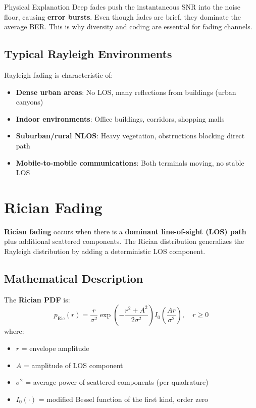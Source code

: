 \begin{calloutbox}{Physical Explanation}
Deep fades push the instantaneous SNR into the noise floor, causing \textbf{error bursts}. Even though fades are brief, they dominate the average BER. This is why diversity and coding are essential for fading channels.
\end{calloutbox}

\subsection{Typical Rayleigh Environments}

Rayleigh fading is characteristic of:
\begin{itemize}
\item \textbf{Dense urban areas}: No LOS, many reflections from buildings (urban canyons)
\item \textbf{Indoor environments}: Office buildings, corridors, shopping malls
\item \textbf{Suburban/rural NLOS}: Heavy vegetation, obstructions blocking direct path
\item \textbf{Mobile-to-mobile communications}: Both terminals moving, no stable LOS
\end{itemize}

\section{Rician Fading}

\textbf{Rician fading} occurs when there is a \textbf{dominant line-of-sight (LOS) path} plus additional scattered components. The Rician distribution generalizes the Rayleigh distribution by adding a deterministic LOS component.

\subsection{Mathematical Description}

The \textbf{Rician PDF} is:
\begin{equation}
p_{\text{Ric}}(r) = \frac{r}{\sigma^2} \exp\left(-\frac{r^2 + A^2}{2\sigma^2}\right) I_0\left(\frac{Ar}{\sigma^2}\right), \quad r \geq 0
\end{equation}
where:
\begin{itemize}
\item $r$ = envelope amplitude
\item $A$ = amplitude of LOS component
\item $\sigma^2$ = average power of scattered components (per quadrature)
\item $I_0(\cdot)$ = modified Bessel function of the first kind, order zero
\end{itemize}

